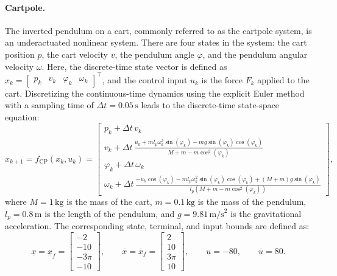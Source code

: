 \paragraph{Cartpole.}
The inverted pendulum on a cart, commonly referred to as the cartpole system, is an underactuated nonlinear system. 
There are four states in the system: the cart position $p$, the cart velocity $v$, the pendulum angle $\varphi$, 
and the pendulum angular velocity $\omega$. 
Here, the discrete-time state vector is defined as $x_k = \begin{bmatrix}p_k & v_k & \varphi_k & \omega_k\end{bmatrix}^\top$,
and the control input $u_k$ is the force $F_k$ applied to the cart. 
Discretizing the continuous-time dynamics using the explicit Euler method with a sampling time of $\Delta t = 0.05\,\text{s}$ 
leads to the discrete-time state-space equation:
\begin{equation}
    \label{eq:cartpole}
    x_{k+1} = f_{\mathrm{CP}}(x_k, u_k) =
    \begin{bmatrix}
        p_k + \Delta t \, v_k \\[4pt]
        v_k + \Delta t \, \frac{u_k + m l_p \omega_k^2 \sin(\varphi_k) - m g \sin(\varphi_k) \cos(\varphi_k)}{M + m - m \cos^2(\varphi_k)} \\[8pt]
        \varphi_k + \Delta t \, \omega_k \\[4pt]
        \omega_k + \Delta t \, \frac{-u_k \cos(\varphi_k) - m l_p \omega_k^2 
        \sin(\varphi_k) \cos(\varphi_k) + (M + m) g \sin(\varphi_k)}{l_p (M + m - m \cos^2(\varphi_k))}
    \end{bmatrix},
\end{equation}
where $M = 1\,\text{kg}$ is the mass of the cart, $m = 0.1\,\text{kg}$ is the mass of the pendulum, $l_p = 0.8\,\text{m}$ is the length of the pendulum, 
and $g = 9.81\,\text{m/s}^2$ is the gravitational acceleration. 
The corresponding state, terminal, and input bounds are defined as:
\begin{equation*}
    \underline{x} = \underline{x}_f = \begin{bmatrix} -2 \\ -10 \\ -3\pi \\ -10 \end{bmatrix}, \qquad
    \overline{x}  = \overline{x}_f = \begin{bmatrix} 2 \\ 10 \\ 3\pi \\ 10 \end{bmatrix}, \qquad
    \underline{u} = -80, \qquad
    \overline{u}  = 80.
\end{equation*} 
